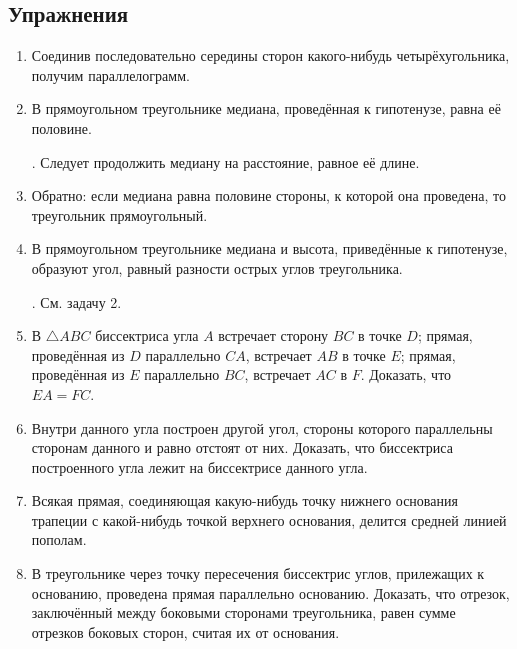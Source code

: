 {\small

\subsection*{Упражнения}


\begin{center}
\end{center}

\begin{enumerate}[noitemsep]

\item
Соединив последовательно середины сторон какого-нибудь четырёхугольника, получим параллелограмм.

\item
В прямоугольном треугольнике медиана, проведённая к гипотенузе, равна её половине.

\smallskip
{}.
Следует продолжить медиану на расстояние, равное её длине.

\item
Обратно:
если медиана равна половине стороны, к которой она проведена, то треугольник прямоугольный.

\item
В прямоугольном треугольнике медиана и высота, приведённые к гипотенузе, образуют угол, равный разности острых углов треугольника.

\smallskip
{}.
См.
задачу 2.

\item
В $\triangle ABC$ биссектриса угла $A$ встречает сторону $BC$ в точке $D$;
прямая, проведённая из $D$ параллельно $CA$, встречает $AB$ в точке $E$;
прямая, проведённая из $E$ параллельно $BC$, встречает $AC$ в $F$.
Доказать, что $EA=FC$.

\item
Внутри данного угла построен другой угол, стороны которого параллельны сторонам данного и равно отстоят от них.
Доказать, что биссектриса построенного угла лежит на биссектрисе данного угла.

\item
Всякая прямая, соединяющая какую-нибудь точку нижнего основания трапеции с какой-нибудь точкой верхнего основания, делится средней линией пополам.

\item
В треугольнике через точку пересечения биссектрис углов, прилежащих к основанию, проведена прямая параллельно основанию.
Доказать, что отрезок, заключённый между боковыми сторонами треугольника, равен сумме отрезков боковых сторон, считая их от основания.


\end{enumerate}}
